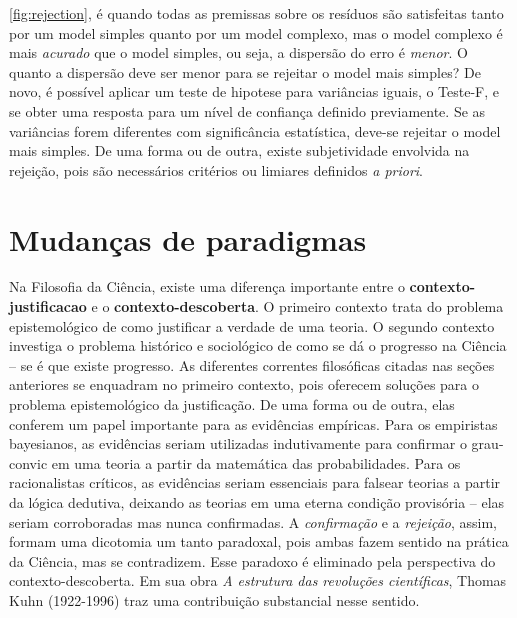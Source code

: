 \documentclass[./main.tex]{subfiles}
\begin{document}
\ref{fig:rejection}, é quando todas as premissas sobre os resíduos são satisfeitas tanto por um \gls{model} simples quanto por um \gls{model} complexo, mas o \gls{model} complexo é mais \textit{acurado} que o \gls{model} simples, ou seja, a dispersão do erro é \textit{menor}. O quanto a dispersão deve ser menor para se rejeitar o \gls{model} mais simples? De novo, é possível aplicar um teste de \gls{hipotese} para variâncias iguais, o Teste-F, e se obter uma resposta para um nível de confiança definido previamente. Se as variâncias forem diferentes com significância estatística, deve-se rejeitar o \gls{model} mais simples. De uma forma ou de outra, existe subjetividade envolvida na rejeição, pois são necessários critérios ou limiares definidos \textit{a priori}.

\section{Mudanças de paradigmas} \label{sec:epis:kuhn}

\par Na Filosofia da Ciência, existe uma diferença importante entre o \textbf{\gls{contexto-justificacao}} e o \textbf{\gls{contexto-descoberta}}. O primeiro contexto trata do problema epistemológico de como justificar a verdade de uma \gls{teoria}. O segundo contexto investiga o problema histórico e sociológico de como se dá o progresso na Ciência – se é que existe progresso. As diferentes correntes filosóficas citadas nas seções anteriores se enquadram no primeiro contexto, pois oferecem soluções para o problema epistemológico da justificação. De uma forma ou de outra, elas conferem um papel importante para as evidências empíricas. Para os empiristas bayesianos, as evidências seriam utilizadas indutivamente para confirmar o \gls{grau-convic} em uma \gls{teoria} a partir da matemática das probabilidades. Para os racionalistas críticos, as evidências seriam essenciais para falsear teorias a partir da lógica dedutiva, deixando as teorias em uma eterna condição provisória – elas seriam corroboradas mas nunca confirmadas. A \textit{confirmação} e a \textit{rejeição}, assim, formam uma dicotomia um tanto paradoxal, pois ambas fazem sentido na prática da Ciência, mas se contradizem. Esse paradoxo é eliminado pela perspectiva do \gls{contexto-descoberta}. Em sua obra \textit{A estrutura das revoluções científicas}, Thomas Kuhn (1922-1996) traz uma contribuição substancial nesse sentido. 
\end{document}
